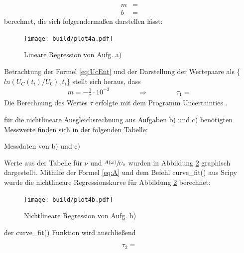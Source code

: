   \begin{align*}
    m &= \text{}\\
    b &= \text{}
  \end{align*}
  berechnet, die sich folgerndermaßen darstellen lässt:
  \begin{figure}[H]
    \centering
    \texttt{[image: build/plot4a.pdf]}
    \caption{Lineare Regression von Aufg. a)}
    \label{fig:4a}
  \end{figure}
   \justifying Betrachtung der Formel \eqref{eq:UcEnt} und der Darstellung der Wertepaare als 
  \{$ln(U_C(t_i)/U_0),t_i$\} stellt sich heraus, dass
  \begin{align}
    m = -\frac{1}{\tau} \cdot 10^{-3} \qquad \qquad
   \Rightarrow \qquad \qquad \tau_1 = \text{}
  \end{align}
  Die Berechnung des Wertes $\tau$ erfolgte mit dem Programm Uncertainties \cite{uncertainties}.

  
  \newpage
   \justifying für die nichtlineare Ausgleichsrechnung aus Aufgaben b) und c) benötigten Messwerte finden sich in der folgenden Tabelle:

  \begin{table}[H]
        \centering
        \caption{Messdaten von b) und c)}
         
        \label{tab:data}
  \end{table}

   \justifying Werte aus der Tabelle für $\nu$ und $\sfrac{A(\omega)}{U_0}$ wurden in Abbildung \ref{fig:4b} graphisch
  dargestellt. Mithilfe der Formel \eqref{eq:A} und dem Befehl curve\_fit() aus Scipy \cite{scipy} wurde 
  die nichtlineare Regressionskurve für Abbildung \ref{fig:4b} berechnet:

  \begin{figure}[H]
    \texttt{[image: build/plot4b.pdf]}
    \centering
    \caption{Nichtlineare Regression von Aufg. b)}
    \label{fig:4b}
  \end{figure}

   \justifying der curve\_fit() Funktion wird anschließend

  \begin{equation}
  \tau_2 = \text{}
  \end{equation}

